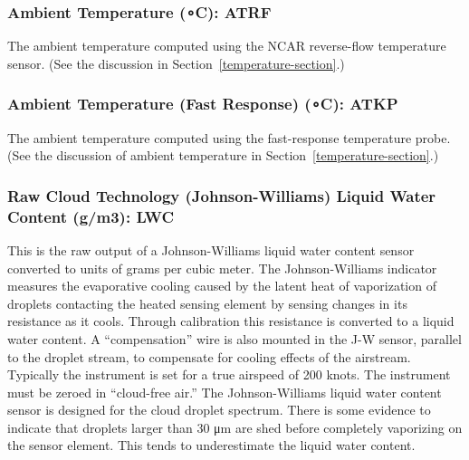 \documentclass[
  english,
]{book}
\begin{document}
\hypertarget{atrf}{%
\subsubsection*{\texorpdfstring{Ambient Temperature ({∘C}): ATRF}{Ambient Temperature (∘C): ATRF}}\label{atrf}}

The ambient temperature computed using the NCAR reverse-flow temperature sensor. (See the discussion in Section~\ref{temperature-section}.)

\hypertarget{atkp}{%
\subsubsection*{\texorpdfstring{Ambient Temperature (Fast Response) ({∘C}): ATKP}{Ambient Temperature (Fast Response) (∘C): ATKP}}\label{atkp}}

The ambient temperature computed using the fast-response temperature probe. (See the discussion of ambient temperature in Section~\ref{temperature-section}.)

\hypertarget{jwlwc}{%
\subsubsection*{\texorpdfstring{Raw Cloud Technology (Johnson-Williams) Liquid Water Content ({g/m3}): LWC}{Raw Cloud Technology (Johnson-Williams) Liquid Water Content (g/m3): LWC}}\label{jwlwc}}

This is the raw output of a Johnson-Williams liquid water content sensor converted to units of grams per cubic meter. The Johnson-Williams indicator measures the evaporative cooling caused by the latent heat of vaporization of droplets contacting the heated sensing element by sensing changes in its resistance as it cools. Through calibration this resistance is converted to a liquid water content. A ``compensation'' wire is also mounted in the J-W sensor, parallel to the droplet stream, to compensate for cooling effects of the airstream. Typically the instrument is set for a true airspeed of 200 knots. The instrument must be zeroed in ``cloud-free air.'' The Johnson-Williams liquid water content sensor is designed for the cloud droplet spectrum. There is some evidence to indicate that droplets larger than 30 {μm} are shed before completely vaporizing on the sensor element. This tends to underestimate the liquid water content.
\end{document}
